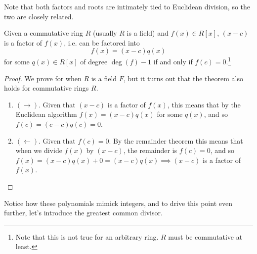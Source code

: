   Note that both factors and roots are intimately tied to Euclidean division, so the two are closely related. 

  \begin{theorem}
    Given a commutative ring $R$ (usually $R$ is a field) and $f(x) \in R[x]$, $(x - c)$ is a factor of $f(x)$, i.e. can be factored into 
    \begin{equation}
      f(x) = (x - c) q(x) 
    \end{equation}
    for some $q(x) \in R[x]$ of degree $\deg(f) - 1$ if and only if $f(c) = 0$.\footnote{Note that this is not true for an arbitrary ring. $R$ must be commutative at least.}
  \end{theorem} 
  \begin{proof}
    We prove for when $R$ is a field $F$, but it turns out that the theorem also holds for commutative rings $R$. 
    \begin{enumerate}
      \item $(\rightarrow)$. Given that $(x - c)$ is a factor of $f(x)$, this means that by the Euclidean algorithm $f(x) = (x - c) q(x)$ for some $q(x)$, and so $f(c) = (c - c) q(c) = 0$. 
      \item $(\leftarrow)$. Given that $f(c) = 0$. By the remainder theorem this means that when we divide $f(x)$ by $(x - c)$, the remainder is $f(c) = 0$, and so $f(x) = (x - c) q(x) + 0 = (x - c) q(x) \implies (x - c)$ is a factor of $f(x)$. 
    \end{enumerate}
  \end{proof}

  Notice how these polynomials mimick integers, and to drive this point even further, let's introduce the greatest common divisor. 


